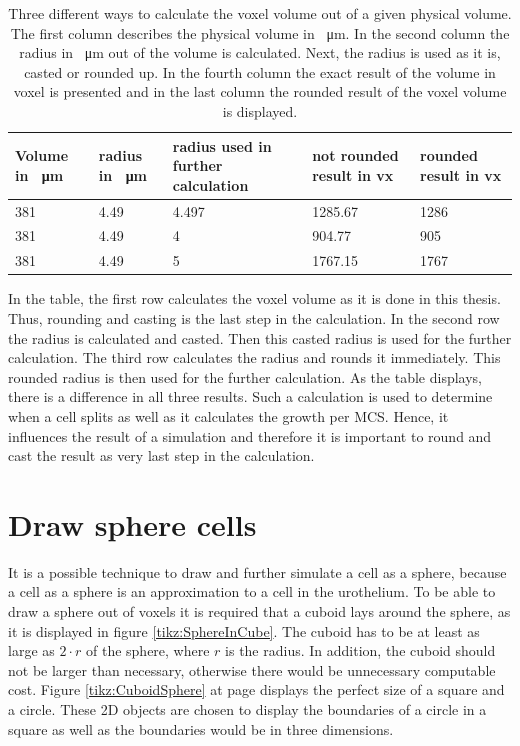 \begin{table}[ht]
\centering
\caption[Different calculations of the convertion of a physical unit into the voxel unit]{Three different ways to calculate the voxel volume out of a given physical volume. The first column describes the physical volume in \SI{}{\micro\metre}. In the second column the radius in \SI{}{\micro\metre} out of the volume is calculated. Next, the radius is used as it is, casted or rounded up. In the fourth column the exact result of the volume in voxel is presented and in the last column the rounded result of the voxel volume is displayed. \newline}
\renewcommand{\arraystretch}{1.5}
	\begin{tabularx}{\textwidth}{|X|X|X|X|X|}
	\hline
		Volume in \SI{}{\micro\metre} & radius in \SI{}{\micro\metre} & radius used in further calculation & not rounded result in vx & rounded result in vx  \\
		\hline
		\hline
		381 & 4.49 & 4.497 & 1285.67 & 1286 \\
		\hline
		381 & 4.49 & 4 & 904.77 & 905\\
		\hline
		381 & 4.49 & 5 & 1767.15 & 1767
\tabularnewline
\hline 
	\end{tabularx}
	\label{tbl:Approximation error3D}
\end{table}

In the table, the first row calculates the voxel volume as it is done in this thesis. Thus, rounding and casting is the last step in the calculation. In the second row the radius is calculated and casted. Then this casted radius is used for the further calculation. The third row calculates the radius and rounds it immediately. This rounded radius is then used for the further calculation. \newline
As the table displays, there is a difference in all three results. Such a calculation is used to determine when a cell splits as well as it calculates the growth per \ac{MCS}. Hence, it influences the result of a simulation and therefore it is important to round and cast the result as very last step in the calculation.




\section{Draw sphere cells}\label{sec:DrawSphereCells}
It is a possible technique to draw and further simulate a cell as a sphere, because a cell as a sphere is an approximation to a cell in the urothelium.  \newline 
To be able to draw a sphere out of voxels it is required that a cuboid lays around the sphere, as it is displayed in figure \ref{tikz:SphereInCube}. The cuboid has to be at least as large as $2 \cdot r$ of the sphere, where $r$ is the radius. In addition, the cuboid should not be larger than necessary, otherwise there would be unnecessary computable cost. Figure \ref{tikz:CuboidSphere} at page \pageref{tikz:CuboidSphere} displays the perfect size of a square and a circle. These 2D objects are chosen to display the boundaries of a circle in a square as well as the boundaries would be in three dimensions.


